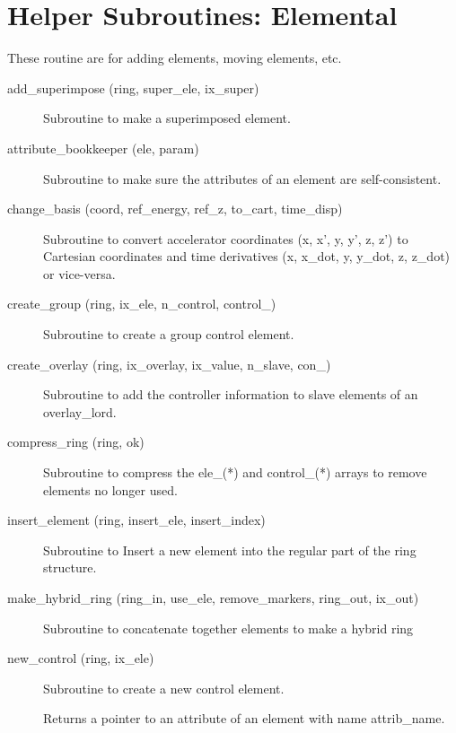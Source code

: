\section{Helper Subroutines: Elemental}
\label{r:elem}     

These routine are for adding elements, moving elements, etc.

\begin{description}

\item[add\_superimpose (ring, super\_ele, ix\_super)] \Newline
Subroutine to make a superimposed element. 

\item[attribute\_bookkeeper (ele, param)] \Newline
Subroutine to make sure the attributes of an element are self-consistent. 

\item[change\_basis (coord, ref\_energy, ref\_z, to\_cart, time\_disp)] \Newline
Subroutine to convert accelerator coordinates (x, x', y, y', z, z') to
Cartesian coordinates and time derivatives (x, x\_dot, y, y\_dot, z,
z\_dot) or vice-versa.

\item[create\_group (ring, ix\_ele, n\_control, control\_)] \Newline
Subroutine to create a group control element. 

\item[create\_overlay (ring, ix\_overlay, ix\_value, n\_slave, con\_)] \Newline
Subroutine to add the controller information to slave elements of an overlay\_lord. 

\item[compress\_ring (ring, ok)] \Newline
Subroutine to compress the ele\_(*) and control\_(*) arrays to remove
elements no longer used.

\item[insert\_element (ring, insert\_ele, insert\_index)] \Newline
Subroutine to Insert a new element into the regular part of the ring structure. 

\item[make\_hybrid\_ring (ring\_in, use\_ele, remove\_markers, ring\_out, ix\_out)] \Newline
Subroutine to concatenate together elements to make a hybrid ring 

\item[new\_control (ring, ix\_ele)] \Newline
Subroutine to create a new control element. 

\item[\protect\parbox{6in}{pointer\_to\_attribute (ele, attrib\_name, do\_allocation, 
\\ \hspace*{2in} ptr\_attrib, ix\_attrib, err\_flag, err\_print\_flag)}] \Newline
Returns a pointer to an attribute of an element with name attrib\_name. 


\end{description}
